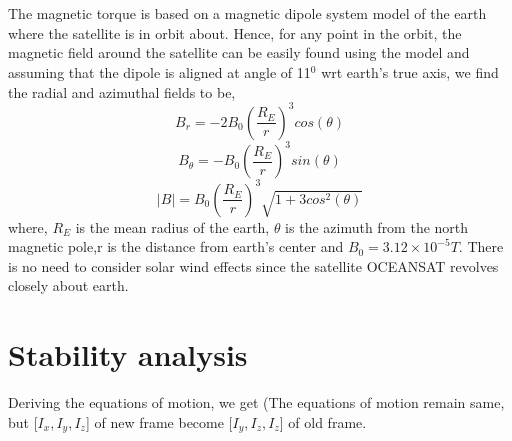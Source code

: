 \documentclass[10pt,a4paper]{report}
\begin{document}
\\ \\The magnetic torque is based on a magnetic dipole system model of the earth where the satellite is in orbit about. Hence, for any point in the orbit, the magnetic field around the satellite can be easily found using the model and assuming that the dipole is aligned at angle of 11$ ^{0} $ wrt earth's true axis, we find the radial and azimuthal fields to be,
\begin{equation}
B_{r}=-2B_{0}\left(\frac{R_{E}}{r}\right)^{3}cos(\theta)
\end{equation}
\begin{equation}
B_{\theta}=-B_{0}\left(\frac{R_{E}}{r}\right)^{3}sin(\theta)
\end{equation}
\begin{equation}
|B|=B_{0}\left(\frac{R_{E}}{r}\right)^{3}\sqrt{1+3cos^{2}(\theta)}
\end{equation}
where, $ R_{E} $ is the mean radius of the earth, $ \theta $ is the azimuth from the north magnetic pole,r is the distance from earth's center and $B_{0}=3.12\times10^{-5}T$. There is no need to consider solar wind effects since the satellite OCEANSAT revolves closely about earth.
\chapter{Stability analysis}
Deriving the equations of motion, we get (The equations of motion remain same, but [$I_{x},I_{y},I_{z}$] of new frame become [$I_{y},I_{z},I_{z}$] of old frame.
\end{document}
